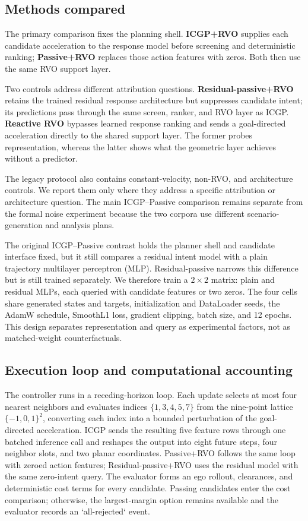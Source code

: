 \documentclass[pdflatex,sn-mathphys-num]{sn-jnl}
\begin{document}
\subsection{Methods compared}

The primary comparison fixes the planning shell. \textbf{ICGP+RVO} supplies each candidate acceleration to the response model before screening and deterministic ranking; \textbf{Passive+RVO} replaces those action features with zeros. Both then use the same RVO support layer.

Two controls address different attribution questions. \textbf{Residual-passive+RVO} retains the trained residual response architecture but suppresses candidate intent; its predictions pass through the same screen, ranker, and RVO layer as ICGP. \textbf{Reactive RVO} bypasses learned response ranking and sends a goal-directed acceleration directly to the shared support layer. The former probes representation, whereas the latter shows what the geometric layer achieves without a predictor.

The legacy protocol also contains constant-velocity, non-RVO, and architecture controls. We report them only where they address a specific attribution or architecture question. The main ICGP--Passive comparison remains separate from the formal noise experiment because the two corpora use different scenario-generation and analysis plans.

The original ICGP--Passive contrast holds the planner shell and candidate interface fixed, but it still compares a residual intent model with a plain trajectory multilayer perceptron (MLP). Residual-passive narrows this difference but is still trained separately. We therefore train a $2\times2$ matrix: plain and residual MLPs, each queried with candidate features or two zeros. The four cells share generated states and targets, initialization and DataLoader seeds, the AdamW schedule, SmoothL1 loss, gradient clipping, batch size, and 12 epochs. This design separates representation and query as experimental factors, not as matched-weight counterfactuals.

\subsection{Execution loop and computational accounting}

The controller runs in a receding-horizon loop. Each update selects at most four nearest neighbors and evaluates indices $\{1,3,4,5,7\}$ from the nine-point lattice $\{-1,0,1\}^2$, converting each index into a bounded perturbation of the goal-directed acceleration. ICGP sends the resulting five feature rows through one batched inference call and reshapes the output into eight future steps, four neighbor slots, and two planar coordinates. Passive+RVO follows the same loop with zeroed action features; Residual-passive+RVO uses the residual model with the same zero-intent query. The evaluator forms an ego rollout, clearances, and deterministic cost terms for every candidate. Passing candidates enter the cost comparison; otherwise, the largest-margin option remains available and the evaluator records an `all-rejected` event.
\end{document}
